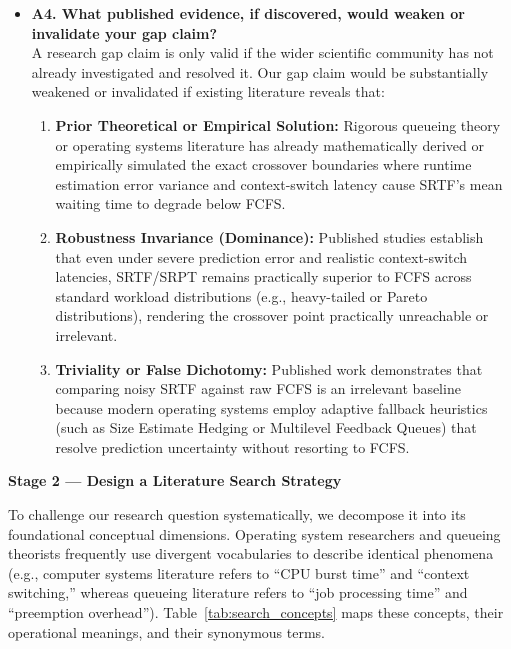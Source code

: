 \documentclass[11pt]{article}
\newcommand{\topicTitle}[1]{
    \vspace{1.2em}\noindent{\fontsize{14}{16.8}\selectfont \textbf{#1}}\par\vspace{0.5em}
}
\newcommand{\qLabel}[1]{
    {\fontsize{12}{14.4}\selectfont \textbf{#1}}
}
\begin{document}
\begin{itemize}[leftmargin=1.5em]
    \vspace{0.8em}
    \item \qLabel{A4. What published evidence, if discovered, would weaken or invalidate your gap claim?} \\
    \vspace{0.2em}
    A research gap claim is only valid if the wider scientific community has not already investigated and resolved it. Our gap claim would be substantially weakened or invalidated if existing literature reveals that:
    \begin{enumerate}[label=(\alph*)]
        \item \textbf{Prior Theoretical or Empirical Solution:} Rigorous queueing theory or operating systems literature has already mathematically derived or empirically simulated the exact crossover boundaries where runtime estimation error variance and context-switch latency cause SRTF's mean waiting time to degrade below FCFS.
        \item \textbf{Robustness Invariance (Dominance):} Published studies establish that even under severe prediction error and realistic context-switch latencies, SRTF/SRPT remains practically superior to FCFS across standard workload distributions (e.g., heavy-tailed or Pareto distributions), rendering the crossover point practically unreachable or irrelevant.
        \item \textbf{Triviality or False Dichotomy:} Published work demonstrates that comparing noisy SRTF against raw FCFS is an irrelevant baseline because modern operating systems employ adaptive fallback heuristics (such as Size Estimate Hedging or Multilevel Feedback Queues) that resolve prediction uncertainty without resorting to FCFS.
    \end{enumerate}

\end{itemize}


\newpage
{\centering\fontsize{16}{20}\selectfont\textbf{Stage 2 --- Design a Literature Search Strategy}\par}
\vspace{1em}

\topicTitle{B. Identify Search Concepts}

To challenge our research question systematically, we decompose it into its foundational conceptual dimensions. Operating system researchers and queueing theorists frequently use divergent vocabularies to describe identical phenomena (e.g., computer systems literature refers to ``CPU burst time'' and ``context switching,'' whereas queueing literature refers to ``job processing time'' and ``preemption overhead''). Table~\ref{tab:search_concepts} maps these concepts, their operational meanings, and their synonymous terms.
\end{document}
